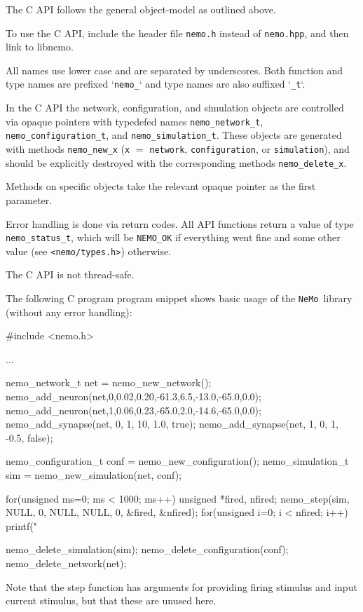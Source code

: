 \documentclass[a4paper]{article}
\newcommand{\nemo}{\texttt{NeMo}}
\newcommand{\code}[1]{\texttt{#1}}
\newcommand{\file}[1]{\texttt{#1}}
\begin{document}
The C API follows the general object-model as outlined above.

To use the C API, include the header file \file{nemo.h} instead of \file{nemo.hpp},
	and then link to libnemo.

All names use lower case and are separated by underscores. 
Both function and type names are prefixed `\code{nemo\_}`
	and type names are also suffixed `\code{\_t}`.

In the C API the network, configuration, and simulation objects are controlled via opaque pointers
	with typedefed names \code{nemo\_network\_t}, \code{nemo\_configuration\_t}, and \code{nemo\_simulation\_t}.
These objects are generated with methods 
	\code{nemo\_new\_x} (\code{x} $=$ \code{network}, \code{configuration}, or \code{simulation}),
	and should be explicitly destroyed with the corresponding methods 
	\code{nemo\_delete\_x}.

Methods on specific objects take the relevant opaque pointer as the first parameter.

Error handling is done via return codes.
All API functions return a value of type \code{nemo\_status\_t},
	which will be \code{NEMO\_OK} if everything went fine and some other value (see \file{<nemo/types.h>}) otherwise.

The C API is not thread-safe.

The following C program program snippet shows basic usage of the \nemo\ library (without any error
handling): 

\begin{ccode}
#include <nemo.h>

...

nemo_network_t net = nemo_new_network();
nemo_add_neuron(net,0,0.02,0.20,-61.3,6.5,-13.0,-65.0,0.0);
nemo_add_neuron(net,1,0.06,0.23,-65.0,2.0,-14.6,-65.0,0.0);
nemo_add_synapse(net, 0, 1, 10, 1.0, true);
nemo_add_synapse(net, 1, 0, 1, -0.5, false);

nemo_configuration_t conf = nemo_new_configuration();
nemo_simulation_t sim = nemo_new_simulation(net, conf);

for(unsigned ms=0; ms < 1000; ms++) {
	unsigned *fired, nfired;
	nemo_step(sim, NULL, 0, NULL, NULL, 0, &fired, &nfired);
	for(unsigned i=0; i < nfired; i++) {
		printf("%
	}
}

nemo_delete_simulation(sim);	
nemo_delete_configuration(conf);
nemo_delete_network(net);
\end{ccode}

Note that the step function has arguments for providing firing stimulus and
input current stimulus, but that these are unused here.
\end{document}
